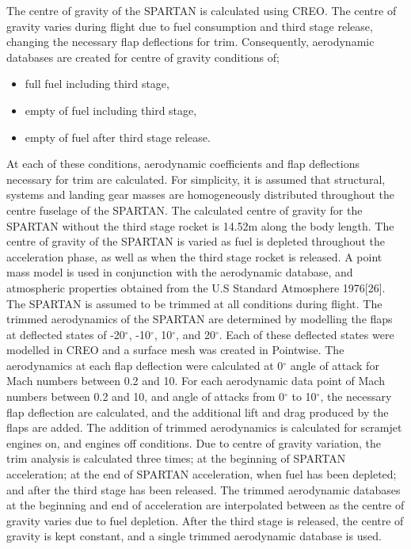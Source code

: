 		The centre of gravity of the SPARTAN is calculated using CREO. The centre of gravity varies during flight due to fuel consumption and third stage release, changing the necessary flap deflections for trim. Consequently, aerodynamic databases are created for centre of gravity conditions of; 
		\begin{itemize}
			\item full fuel including third stage,
			\item empty of fuel including third stage,
			\item empty of fuel after third stage release.
		\end{itemize}
		At each of these conditions, aerodynamic coefficients and flap deflections necessary for trim are calculated.  For simplicity, it is assumed that structural, systems and landing gear masses are homogeneously distributed throughout the centre fuselage of the SPARTAN. The calculated centre of gravity for the SPARTAN without the third stage rocket is 14.52m along the body length. 
		The centre of gravity of the SPARTAN is varied as fuel is depleted throughout the acceleration phase, as well as when the third stage rocket is released. A point mass model is used in conjunction with the aerodynamic database,
		and atmospheric properties obtained from the U.S Standard Atmosphere 1976[26]. The SPARTAN is assumed to be
		trimmed at all conditions during flight.
		The trimmed aerodynamics of the SPARTAN are determined by modelling the flaps at deflected states of -20$^\circ$, -10$^\circ$, 10$^\circ$, and 20$^\circ$. Each of these deflected states were modelled in CREO and a surface mesh was created in Pointwise. The aerodynamics at each flap deflection were calculated at 0$^\circ$ angle of attack for Mach numbers between 0.2 and 10. For each aerodynamic data point of Mach numbers between 0.2 and 10, and angle of attacks from 0$^\circ$ to 10$^\circ$, the necessary flap deflection are calculated, and the additional lift and drag produced by the flaps are added. The addition of trimmed aerodynamics is calculated for scramjet engines on, and engines off conditions. Due to centre of gravity variation, the trim analysis is calculated three times; at the beginning of SPARTAN acceleration; at the end of SPARTAN acceleration, when fuel has been depleted; and after the third stage has been released. The trimmed aerodynamic databases at the beginning and end of acceleration are interpolated between as the centre of gravity varies due to fuel depletion. After the third stage is released, the centre of gravity is kept constant, and a single trimmed aerodynamic database is used. 
		
